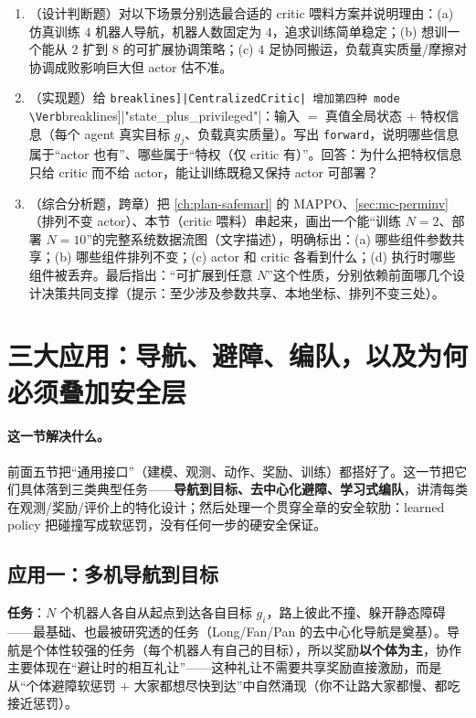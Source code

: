 \begin{practice}
\begin{enumerate}
  \item （设计判断题）对以下场景分别选最合适的 critic 喂料方案并说明理由：(a) 仿真训练 $4$ 机器人导航，机器人数固定为 $4$，追求训练简单稳定；(b) 想训一个能从 $2$ 扩到 $8$ 的可扩展协调策略；(c) $4$ 足协同搬运，负载真实质量/摩擦对协调成败影响巨大但 actor 估不准。
  \item （实现题）给 \Verb[breaklines]|CentralizedCritic| 增加第四种 mode \Verb[breaklines]|"state_plus_privileged"|：输入 $=$ 真值全局状态 $+$ 特权信息（每个 agent 真实目标 $g_j$、负载真实质量）。写出 \verb|forward|，说明哪些信息属于“actor 也有”、哪些属于“特权（仅 critic 有）”。回答：为什么把特权信息只给 critic 而不给 actor，能让训练既稳又保持 actor 可部署？
  \item （综合分析题，跨章）把 \cref{ch:plan-safemarl} 的 MAPPO、\cref{sec:mc-perminv}（排列不变 actor）、本节（critic 喂料）串起来，画出一个能“训练 $N{=}2$、部署 $N{=}10$”的完整系统数据流图（文字描述），明确标出：(a) 哪些组件参数共享；(b) 哪些组件排列不变；(c) actor 和 critic 各看到什么；(d) 执行时哪些组件被丢弃。最后指出：“可扩展到任意 $N$”这个性质，分别依赖前面哪几个设计决策共同支撑（提示：至少涉及参数共享、本地坐标、排列不变三处）。
\end{enumerate}
\end{practice}

\section{三大应用：导航、避障、编队，以及为何必须叠加安全层}
\label{sec:mc-apps}

\paragraph{这一节解决什么。}
前面五节把“通用接口”（建模、观测、动作、奖励、训练）都搭好了。这一节把它们具体落到三类典型任务——\textbf{导航到目标、去中心化避障、学习式编队}，讲清每类在观测/奖励/评价上的特化设计；然后处理一个贯穿全章的安全软肋：learned policy 把碰撞写成软惩罚，没有任何一步的硬安全保证。

\subsection{应用一：多机导航到目标}
\label{sec:mc-app-nav}
\textbf{任务}：$N$ 个机器人各自从起点到达各自目标 $g_i$，路上彼此不撞、躲开静态障碍——最基础、也最被研究透的任务（Long/Fan/Pan 的去中心化导航是奠基\cite{long2018collision}）。导航是个体性较强的任务（每个机器人有自己的目标），所以奖励\textbf{以个体为主}，协作主要体现在“避让时的相互礼让”——这种礼让不需要共享奖励直接激励，而是从“个体避障软惩罚 $+$ 大家都想尽快到达”中自然涌现（你不让路大家都慢、都吃接近惩罚）。

